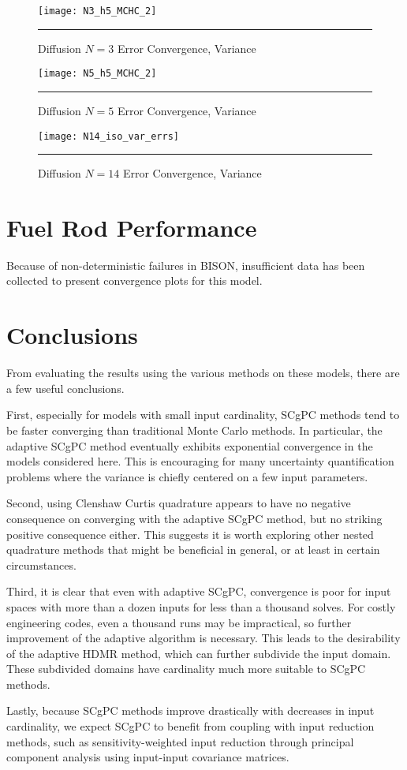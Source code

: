\begin{figure}[H]
  \centering
    \texttt{[image: N3\_h5\_MCHC\_2]}
    \rule{35em}{0.5pt}
  \caption{Diffusion $N=3$ Error Convergence, Variance}
  \label{fig:diff3_varconv}
\end{figure}
\begin{figure}[H]
  \centering
    \texttt{[image: N5\_h5\_MCHC\_2]}
    \rule{35em}{0.5pt}
  \caption{Diffusion $N=5$ Error Convergence, Variance}
  \label{fig:diff5_varconv}
\end{figure}
\begin{figure}[H]
  \centering
    \texttt{[image: N14\_iso\_var\_errs]}
    \rule{35em}{0.5pt}
  \caption{Diffusion $N=14$ Error Convergence, Variance}
  \label{fig:diff14_varconv}
\end{figure}





\section{Fuel Rod Performance}
Because of non-deterministic failures in BISON, insufficient data has been collected to present convergence
plots for this model.


\section{Conclusions}
From evaluating the results using the various methods on these models, there are a few useful conclusions.

First, especially for models with small input cardinality, SCgPC methods tend to be faster converging than
traditional Monte Carlo methods.  In particular, the adaptive SCgPC method eventually exhibits exponential
convergence in the models considered here.  This is encouraging for many uncertainty quantification problems
where the variance is chiefly centered on a few input parameters.

Second, using Clenshaw Curtis quadrature appears to have no negative consequence on converging with the
adaptive SCgPC method, but no striking positive consequence either.  This suggests it is worth exploring other
nested quadrature methods that might be beneficial in general, or at least in certain circumstances.

Third, it is clear that even with adaptive SCgPC, convergence is poor for input spaces with more than a dozen
inputs for less than a thousand solves.  For costly engineering codes, even a thousand runs may be
impractical, so further improvement of the adaptive algorithm is necessary.  This leads to the desirability of
the adaptive HDMR method, which can further subdivide the input domain.  These subdivided domains have
cardinality much more suitable to SCgPC methods.

Lastly, because SCgPC methods improve drastically with decreases in input cardinality, we expect SCgPC to
benefit from coupling with input reduction methods, such as sensitivity-weighted input reduction through
principal component analysis using input-input covariance matrices.
